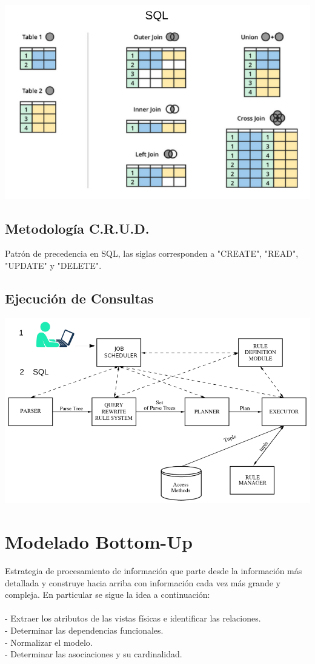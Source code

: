 \documentclass[12pt]{article}
\begin{document}
\begin{center}
\includegraphics[scale=0.25]{join.png}
\end{center}

\subsection*{Metodología C.R.U.D.}
Patrón de precedencia en SQL, las siglas corresponden a "CREATE", "READ", "UPDATE" y "DELETE".

\subsection*{Ejecución de Consultas}

\begin{center}
\includegraphics[scale=0.25]{consultas.png}
\end{center}

\newpage

\section*{Modelado Bottom-Up}
Estrategia de procesamiento de información que parte desde la información más detallada y construye
hacia arriba con información cada vez más grande y compleja. En particular se sigue la idea a
continuación:
\\\\
- Extraer los atributos de las vistas físicas e identificar las relaciones.
\\
- Determinar las dependencias funcionales.
\\
- Normalizar el modelo.
\\
- Determinar las asociaciones y su cardinalidad.
\end{document}
